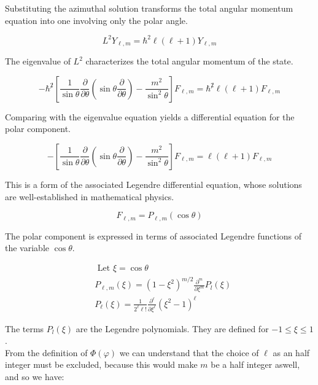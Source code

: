 \documentclass[italian]{HKNdocument}
\begin{document}
Substituting the azimuthal solution transforms the total angular momentum equation into one involving only the polar angle.

\begin{equation}
L^{2} Y_{\ell, m}=\hbar^{2} \ell(\ell+1) Y_{\ell, m}
\end{equation}

The eigenvalue of $L^2$ characterizes the total angular momentum of the state.

\begin{equation}
-\hbar^{\not 2}\left[\frac{1}{\sin \theta} \frac{\partial}{\partial \theta}\left(\sin \theta \frac{\partial}{\partial \theta}\right)-\frac{m^{2}}{\sin ^{2} \theta}\right] F_{\ell, m}=\hbar^{\not 2} \ell(\ell+1) F_{\ell, m}
\end{equation}

Comparing with the eigenvalue equation yields a differential equation for the polar component.

\begin{equation}
-\left[\frac{1}{\sin \theta} \frac{\partial}{\partial \theta}\left(\sin \theta \frac{\partial}{\partial \theta}\right)-\frac{m^{2}}{\sin ^{2} \theta}\right] F_{\ell, m}=\ell(\ell+1) F_{\ell, m}
\end{equation}

This is a form of the associated Legendre differential equation, whose solutions are well-established in mathematical physics.

\begin{equation}
F_{\ell, m}=P_{\ell, m}(\cos \theta)
\end{equation}

The polar component is expressed in terms of associated Legendre functions of the variable $\cos\theta$.

\begin{align}
& \text { Let } \xi=\cos \theta \\
& P_{\ell, m}(\xi)=\left(1-\xi^{2}\right)^{m / 2} \frac{\partial^{m}}{\partial \xi^{m}} P_{l}(\xi)  \\
& P_{\ell}(\xi)=\frac{1}{2^{\ell} \ell!} \frac{\partial^{\ell}}{\partial \xi^{\ell}}\left(\xi^{2}-1\right)^{\ell}
\end{align}

The terms $P_{l}(\xi)$ are the Legendre polynomials. They are defined for $-1 \leq \xi \leq 1$.\\
From the definition of $\Phi(\varphi)$ we can understand that the choice of $\ell$ as an half integer must be excluded, because this would make $m$ be a half integer aswell, and so we have:
\end{document}
